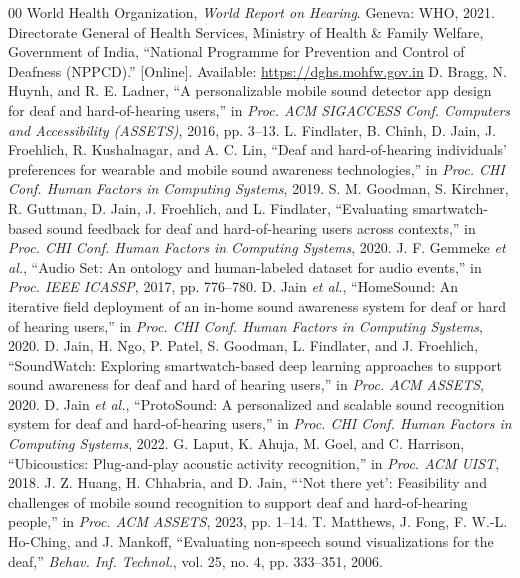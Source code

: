 \documentclass[conference,a4paper]{IEEEtran}
\begin{document}
\begin{thebibliography}{00}
 World Health Organization, \textit{World Report on Hearing}. Geneva: WHO, 2021.
 Directorate General of Health Services, Ministry of Health \& Family Welfare, Government of India, ``National Programme for Prevention and Control of Deafness (NPPCD).'' [Online]. Available: \url{https://dghs.mohfw.gov.in}
 D. Bragg, N. Huynh, and R. E. Ladner, ``A personalizable mobile sound detector app design for deaf and hard-of-hearing users,'' in \textit{Proc. ACM SIGACCESS Conf. Computers and Accessibility (ASSETS)}, 2016, pp. 3--13.
 L. Findlater, B. Chinh, D. Jain, J. Froehlich, R. Kushalnagar, and A. C. Lin, ``Deaf and hard-of-hearing individuals' preferences for wearable and mobile sound awareness technologies,'' in \textit{Proc. CHI Conf. Human Factors in Computing Systems}, 2019.
 S. M. Goodman, S. Kirchner, R. Guttman, D. Jain, J. Froehlich, and L. Findlater, ``Evaluating smartwatch-based sound feedback for deaf and hard-of-hearing users across contexts,'' in \textit{Proc. CHI Conf. Human Factors in Computing Systems}, 2020.
 J. F. Gemmeke \textit{et al.}, ``Audio Set: An ontology and human-labeled dataset for audio events,'' in \textit{Proc. IEEE ICASSP}, 2017, pp. 776--780.
 D. Jain \textit{et al.}, ``HomeSound: An iterative field deployment of an in-home sound awareness system for deaf or hard of hearing users,'' in \textit{Proc. CHI Conf. Human Factors in Computing Systems}, 2020.
 D. Jain, H. Ngo, P. Patel, S. Goodman, L. Findlater, and J. Froehlich, ``SoundWatch: Exploring smartwatch-based deep learning approaches to support sound awareness for deaf and hard of hearing users,'' in \textit{Proc. ACM ASSETS}, 2020.
 D. Jain \textit{et al.}, ``ProtoSound: A personalized and scalable sound recognition system for deaf and hard-of-hearing users,'' in \textit{Proc. CHI Conf. Human Factors in Computing Systems}, 2022.
 G. Laput, K. Ahuja, M. Goel, and C. Harrison, ``Ubicoustics: Plug-and-play acoustic activity recognition,'' in \textit{Proc. ACM UIST}, 2018.
 J. Z. Huang, H. Chhabria, and D. Jain, ```Not there yet': Feasibility and challenges of mobile sound recognition to support deaf and hard-of-hearing people,'' in \textit{Proc. ACM ASSETS}, 2023, pp. 1--14.
 T. Matthews, J. Fong, F. W.-L. Ho-Ching, and J. Mankoff, ``Evaluating non-speech sound visualizations for the deaf,'' \textit{Behav. Inf. Technol.}, vol. 25, no. 4, pp. 333--351, 2006.

\end{thebibliography}
\end{document}
